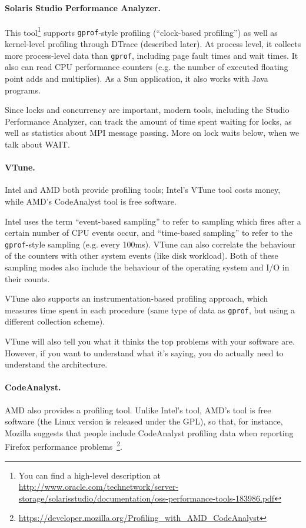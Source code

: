 \documentclass[a4paper]{report}
\begin{document}
\paragraph{Solaris Studio Performance Analyzer.} This 
tool\footnote{You can find a high-level description at
  \url{http://www.oracle.com/technetwork/server-storage/solarisstudio/documentation/oss-performance-tools-183986.pdf}}
supports {\tt gprof}-style profiling (``clock-based profiling'') as
well as kernel-level profiling through DTrace (described later). At
process level, it collects more process-level data than {\tt gprof},
including page fault times and wait times. It also can read CPU
performance counters (e.g. the number of executed floating point adds
and multiplies).  As a Sun application, it also works with Java
programs.

Since locks and concurrency are important, modern tools, including the
Studio Performance Analyzer, can track the amount of time spent
waiting for locks, as well as statistics about MPI message
passing. More on lock waits below, when we talk about WAIT.

\paragraph{VTune.} Intel and AMD both provide profiling
tools; Intel's VTune tool costs money, while AMD's CodeAnalyst tool is
free software.

Intel uses the term ``event-based sampling'' to refer to sampling 
which fires after a certain number of CPU events occur, and ``time-based
sampling'' to refer to the {\tt gprof}-style sampling (e.g. every 100ms).
VTune can also correlate the behaviour of the counters with other
system events (like disk workload). Both of these sampling modes
also include the behaviour of the operating system and I/O in their
counts.

VTune also supports an instrumentation-based profiling approach,
which measures time spent in each procedure (same type of
data as {\tt gprof}, but using a different collection scheme).

VTune will also tell you what it thinks the top problems with your
software are. However, if you want to understand what it's saying,
you do actually need to understand the architecture.

\paragraph{CodeAnalyst.} AMD also provides a profiling tool. Unlike Intel's tool, AMD's tool is
free software (the Linux version is released under the GPL), so that,
for instance, Mozilla suggests that people include CodeAnalyst
profiling data when reporting Firefox performance
problems~\footnote{\url{https://developer.mozilla.org/Profiling_with_AMD_CodeAnalyst}}.
\end{document}
